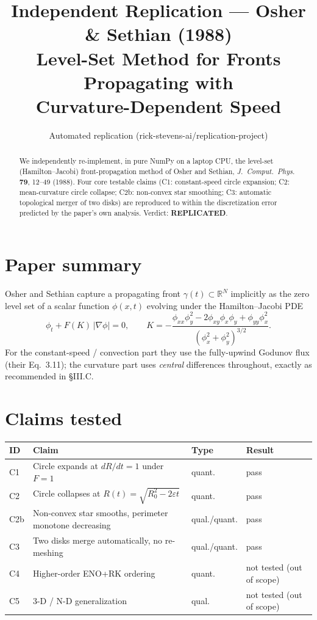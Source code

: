 \documentclass[11pt]{article}
\title{Independent Replication --- Osher \& Sethian (1988)\\
       Level-Set Method for Fronts Propagating with\\
       Curvature-Dependent Speed}
\author{Automated replication (rick-stevens-ai/replication-project)}
\date{}
\begin{document}
\maketitle

\begin{abstract}
We independently re-implement, in pure NumPy on a laptop CPU, the
level-set (Hamilton--Jacobi) front-propagation method of Osher and
Sethian, \emph{J.\ Comput.\ Phys.} \textbf{79}, 12--49 (1988). Four
core testable claims (C1: constant-speed circle expansion; C2:
mean-curvature circle collapse; C2b: non-convex star smoothing; C3:
automatic topological merger of two disks) are reproduced to within
the discretization error predicted by the paper's own analysis.
Verdict: \textbf{REPLICATED}.
\end{abstract}

\section{Paper summary}
Osher and Sethian capture a propagating front
$\gamma(t) \subset \mathbb{R}^N$ implicitly as the zero level set of a
scalar function $\phi(x,t)$ evolving under the Hamilton--Jacobi PDE
\begin{equation}
\phi_t + F(K)\,|\nabla\phi| = 0,
\qquad
K = -\frac{\phi_{xx}\phi_y^{2} - 2\phi_{xy}\phi_x\phi_y + \phi_{yy}\phi_x^{2}}
        {(\phi_x^{2}+\phi_y^{2})^{3/2}} .
\end{equation}
For the constant-speed / convection part they use the fully-upwind
Godunov flux (their Eq.~3.11); the curvature part uses \emph{central}
differences throughout, exactly as recommended in \S III.C.

\section{Claims tested}
\begin{center}
\begin{tabular}{@{}llll@{}}
\toprule
ID  & Claim                                                    & Type   & Result \\
\midrule
C1  & Circle expands at $dR/dt = 1$ under $F{=}1$              & quant. & pass \\
C2  & Circle collapses at $R(t)=\sqrt{R_0^{2}-2\varepsilon t}$ & quant. & pass \\
C2b & Non-convex star smooths, perimeter monotone decreasing    & qual./quant. & pass \\
C3  & Two disks merge automatically, no re-meshing             & qual./quant. & pass \\
C4  & Higher-order ENO+RK ordering                             & quant. & not tested (out of scope) \\
C5  & 3-D / N-D generalization                                 & qual.  & not tested (out of scope) \\
\bottomrule
\end{tabular}
\end{center}
\end{document}
